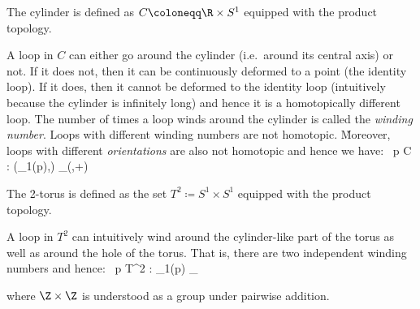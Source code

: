 \be
The cylinder is defined as $C \coloneqq \R\times S^1$ equipped with the product topology.

\begin{center}
\end{center}

A loop in $C$ can either go around the cylinder (i.e.\ around its central axis) or not. If it does not, then it can
be continuously deformed to a point (the identity loop). If it does, then it cannot be deformed to the identity loop
(intuitively because the cylinder is infinitely long) and hence it is a homotopically different loop. The number of
times a loop winds around the cylinder is called the \emph{winding number}. Loops with different winding numbers are
not homotopic. \v

Moreover, loops with different \emph{orientations} are also not homotopic and hence we have:
\bse
\forall \, p \in C : (\pi_1(p),\bullet) \cong_(\Z,+)
\ese
\ee

\be
The 2-torus is defined as the set $T^2 \coloneqq S^1\times S^1$ equipped with the product topology.

\begin{center}
\end{center}

A loop in $T^2$ can intuitively wind around the cylinder-like part of the torus as well as around the hole of the
torus. That is, there are two independent winding numbers and hence:
\bse
\forall \, p \in T^2 : \pi_1(p) \cong_\Z\times \Z
\ese

where $\Z\times \Z$ is understood as a group under pairwise addition.
\ee